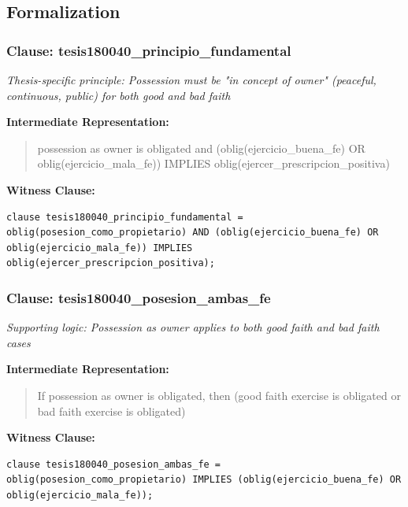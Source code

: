 \documentclass[11pt,a4paper]{article}
\begin{document}
\subsection{Formalization}

\subsubsection{Clause: tesis180040\_principio\_fundamental}

\textit{Thesis-specific principle: Possession must be "in concept of owner" (peaceful, continuous, public) for both good and bad faith}

\textbf{Intermediate Representation:}

\begin{quote}
possession as owner is obligated and (oblig(ejercicio\_buena\_fe) OR oblig(ejercicio\_mala\_fe)) IMPLIES oblig(ejercer\_prescripcion\_positiva)
\end{quote}

\textbf{Witness Clause:}

\begin{lstlisting}[style=witnessstyle, language=Witness]
clause tesis180040_principio_fundamental = oblig(posesion_como_propietario) AND (oblig(ejercicio_buena_fe) OR oblig(ejercicio_mala_fe)) IMPLIES oblig(ejercer_prescripcion_positiva);
\end{lstlisting}

\subsubsection{Clause: tesis180040\_posesion\_ambas\_fe}

\textit{Supporting logic: Possession as owner applies to both good faith and bad faith cases}

\textbf{Intermediate Representation:}

\begin{quote}
If possession as owner is obligated, then (good faith exercise is obligated or bad faith exercise is obligated)
\end{quote}

\textbf{Witness Clause:}

\begin{lstlisting}[style=witnessstyle, language=Witness]
clause tesis180040_posesion_ambas_fe = oblig(posesion_como_propietario) IMPLIES (oblig(ejercicio_buena_fe) OR oblig(ejercicio_mala_fe));
\end{lstlisting}
\end{document}
